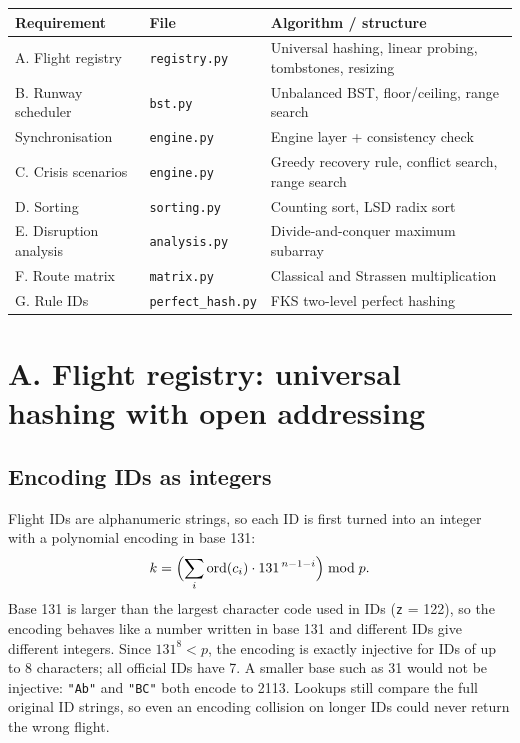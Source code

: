\documentclass[11pt]{article}
\begin{document}
\begin{center}
\begin{tabular}{@{}lll@{}}
\toprule
Requirement & File & Algorithm / structure \\
\midrule
A. Flight registry & \texttt{registry.py} & Universal hashing, linear probing, tombstones, resizing \\
B. Runway scheduler & \texttt{bst.py} & Unbalanced BST, floor/ceiling, range search \\
Synchronisation & \texttt{engine.py} & Engine layer + consistency check \\
C. Crisis scenarios & \texttt{engine.py} & Greedy recovery rule, conflict search, range search \\
D. Sorting & \texttt{sorting.py} & Counting sort, LSD radix sort \\
E. Disruption analysis & \texttt{analysis.py} & Divide-and-conquer maximum subarray \\
F. Route matrix & \texttt{matrix.py} & Classical and Strassen multiplication \\
G. Rule IDs & \texttt{perfect\_hash.py} & FKS two-level perfect hashing \\
\bottomrule
\end{tabular}
\end{center}

\section{A. Flight registry: universal hashing with open addressing}

\subsection{Encoding IDs as integers}
Flight IDs are alphanumeric strings, so each ID is first turned into an integer
with a polynomial encoding in base 131:
\[
k = \Bigl(\sum_{i} \mathrm{ord}(c_i)\cdot 131^{\,n-1-i}\Bigr) \bmod p .
\]
Base 131 is larger than the largest character code used in IDs
(\texttt{z} = 122), so the encoding behaves like a number written in base 131
and different IDs give different integers. Since $131^8 < p$, the encoding is
exactly injective for IDs of up to 8 characters; all official IDs have 7.
A smaller base such as 31 would not be injective:
\texttt{"Ab"} and \texttt{"BC"} both encode to 2113.
Lookups still compare the full original ID strings, so even an encoding
collision on longer IDs could never return the wrong flight.
\end{document}
